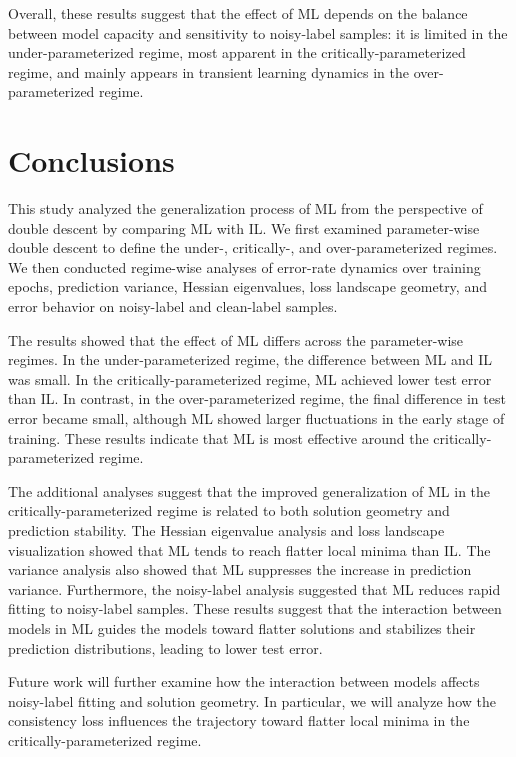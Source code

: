 \documentclass[dvipdfmx]{nolta}        %
\begin{document}
Overall, these results suggest that the effect of ML depends on the balance between model capacity and sensitivity to noisy-label samples: it is limited in the under-parameterized regime, most apparent in the critically-parameterized regime, and mainly appears in transient learning dynamics in the over-parameterized regime.

\section{Conclusions}

This study analyzed the generalization process of ML from the perspective of double descent by comparing ML with IL. We first examined parameter-wise double descent to define the under-, critically-, and over-parameterized regimes. We then conducted regime-wise analyses of error-rate dynamics over training epochs, prediction variance, Hessian eigenvalues, loss landscape geometry, and error behavior on noisy-label and clean-label samples.

The results showed that the effect of ML differs across the parameter-wise regimes. In the under-parameterized regime, the difference between ML and IL was small. In the critically-parameterized regime, ML achieved lower test error than IL. In contrast, in the over-parameterized regime, the final difference in test error became small, although ML showed larger fluctuations in the early stage of training. These results indicate that ML is most effective around the critically-parameterized regime.

The additional analyses suggest that the improved generalization of ML in the critically-parameterized regime is related to both solution geometry and prediction stability. The Hessian eigenvalue analysis and loss landscape visualization showed that ML tends to reach flatter local minima than IL. The variance analysis also showed that ML suppresses the increase in prediction variance. Furthermore, the noisy-label analysis suggested that ML reduces rapid fitting to noisy-label samples. These results suggest that the interaction between models in ML guides the models toward flatter solutions and stabilizes their prediction distributions, leading to lower test error.

Future work will further examine how the interaction between models affects noisy-label fitting and solution geometry. In particular, we will analyze how the consistency loss influences the trajectory toward flatter local minima in the critically-parameterized regime.
\end{document}
